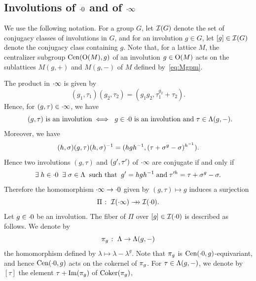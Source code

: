 \documentclass{amsart} %
\begin{document}
\subsection{Involutions of $\cdot 0$ and of $\cdot \infty$}\label{subsec:zinf}
%
We use the following notation.
For a group $G$,  let $\mathord{\mathcal{I}}(G)$ denote the set of conjugacy classes of involutions in $G$, and 
for an involution $g\in G$, let $[g]\in \mathord{\mathcal{I}}(G)$ denote the conjugacy class containing $g$.
Note that, for a lattice $M$, 
 the centralizer subgroup  $\mathrm{Cen}(\mathord{\mathrm{O}}(M), g)$ 
 of an involution  $g\in \mathord{\mathrm{O}}(M)$
acts on 
the sublattices $M(g, +)$ and  $M(g, -)$ of $M$ defined by~\eqref{eq:Mgpm}.
\par
The product in $\cdot \infty$ is  given by 
\[
(g_1, \tau_1)(g_2, \tau_2)=(g_1g_2, \tau_1^{g_2}+\tau_2).
\]
Hence, for $(g, \tau)\in \cdot \infty$, we have 
%
\begin{equation}\label{eq:gtauisinvoliff}
\textrm{\;\;$(g, \tau)$ is an involution}
\;\Longleftrightarrow\;
\textrm{
$g\in \cdot 0$ is an involution  and $\tau\in \Lambda(g, -)$}.
\end{equation}
%
Moreover, we have 
%
\begin{equation}\label{eq:hsgthsinv}
(h, \sigma)(g, \tau)(h, \sigma)^{-1}
=(hgh^{-1}, (\tau+\sigma^g-\sigma)^{h^{-1}}).
\end{equation}
%
Hence 
two involutions $(g, \tau)$ and $(g^{\prime}, \tau^{\prime})$ of  $\cdot \infty$  are conjugate if and only if
%
\begin{equation}\label{eq:conjiff}
\exists\; h\in \cdot 0 \;\;
\exists\; \sigma\in \Lambda  \;\;
\textrm{such that}  \;\;
g^{\prime}=h g h^{-1}
\;\textrm{and}\; \tau\sp{\prime h}=\tau+\sigma^{g}-\sigma.
\end{equation}
%
Therefore the homomorphism $\cdot \infty \to \cdot 0$ given by $(g, \tau)\mapsto g$
induces a surjection %
\[
\Pi\;\colon\; \mathord{\mathcal{I}}(\cdot \infty)\mathrel{\rightarrow\!\!\!\!\rightarrow} \mathord{\mathcal{I}}(\cdot 0).
\]
Let $g\in \cdot 0$ be an involution.
The fiber of $\Pi$ over $[g]\in\mathord{\mathcal{I}}(\cdot 0)$ is described as follows.
We denote by 
\[
\pi_{g}\;\colon\; \Lambda \to \Lambda (g, -)
\]
the homomorphism defined by  $\lambda\mapsto \lambda-\lambda^g$.
Note that $\pi_{g}$ is $\mathrm{Cen}(\cdot 0, g)$-equivariant,
and hence $\mathrm{Cen}(\cdot 0, g)$ acts on the cokernel of $\pi_{g}$.
For $\tau\in \Lambda (g, -)$, 
we denote by $[\tau]$ the element $\tau+\operatorname{Im}(\pi_{g})$ of $\operatorname{Coker}(\pi_{g})$,
\end{document}
